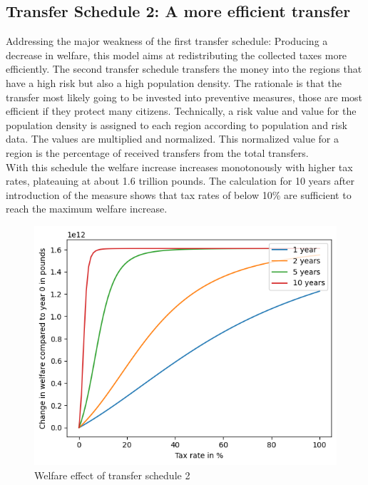 \documentclass[10pt,a4paper]{article}
\begin{document}
\subsection{Transfer Schedule 2: A more efficient transfer}
Addressing the major weakness of the first transfer schedule: Producing a decrease in welfare, this model aims at redistributing the collected taxes more efficiently.
The second transfer schedule transfers the money into the regions that have a high risk but also a high population density. The rationale is that the transfer most likely going to be invested into preventive measures, those are most efficient if they protect many citizens.
Technically, a risk value and value for the population density is assigned to each region according to population and risk data. The values are multiplied and normalized. This normalized value for a region is the percentage of received transfers from the total transfers.
\\
With this schedule the welfare increase increases monotonously with higher tax rates, plateauing at about 1.6 trillion pounds. The calculation for 10 years after introduction of the measure shows that tax rates of below 10\% are sufficient to reach the maximum welfare increase.
\begin{figure}
    \centering
    \includegraphics{Report/schedule2.png}
    \caption{Welfare effect of transfer schedule 2}
    \label{fig:sche2}
\end{figure}
\\
\end{document}
